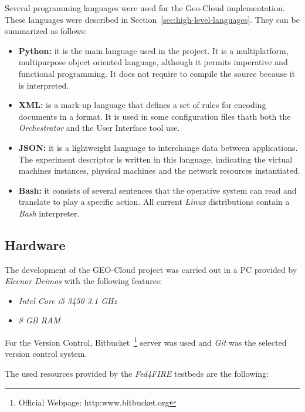 Several programming languages were used for the Geo-Cloud
implementation. These languages were described in
Section~\ref{sec:high-level-languages}. They can be
summarized as follows:

\begin{itemize}
\item \textbf{Python:}  it is the main language used in the project. It is a
  multiplatform, multipurpose object oriented language, although it permits imperative and functional
programming. It does not require to compile the source because it is
interpreted.
 \item \textbf{\ac{XML}:} is a mark-up language that defines a set of rules for encoding
documents in a format. It is used in some configuration files thath both the
\emph{Orchestrator} and the User Interface tool use.

\item \textbf{\ac{JSON}:} it is a lightweight language to interchange data between
  applications. The \bonfire experiment descriptor is written in this
  language, indicating the virtual machines instances, physical machines and the
  network resources instantiated.

\item \textbf{Bash:} it consists of several sentences that the operative system can read and translate to play a specific action. All current
\emph{Linux} distributions contain a \emph{Bash} interpreter. 

\end{itemize}


\subsection{Hardware}

The development of the GEO-Cloud project was carried out in a PC provided by
\emph{Elecnor Deimos} with the following features:
\begin{itemize}
\item \emph{Intel Core i5 3450 3.1 GHz}
\item \emph{8 GB RAM}
\end{itemize}

For the Version Control, Bitbucket~\footnote{Official Webpage: http:www.bitbucket.org} server was
used and \emph{Git} was the selected version control system.

The used resources provided  by the \emph{Fed4FIRE} testbeds are the following:

